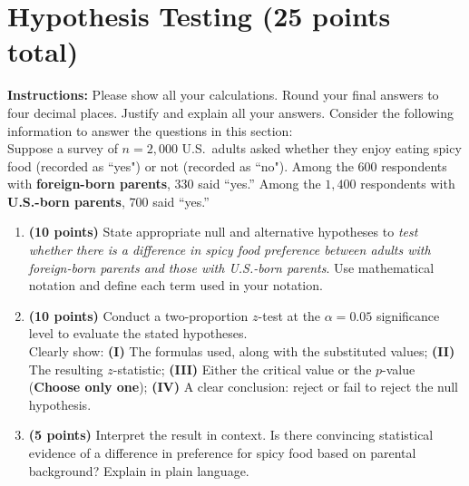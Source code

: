 \documentclass{article}
\newcommand{\blankbox}[2][3cm]{%
    \vspace{-0.5em}
    \begin{figure}[H]
        \makebox[\linewidth]{%
            \begin{tcolorbox}[
                colback=white,
                colframe=white,  %
                width=#2, %
                height=#1,
                boxrule=0.2mm
            ]
            \end{tcolorbox}
        }
    \end{figure}
    \vspace{-2em}
}
\begin{document}
\newpage

\section{Hypothesis Testing (25 points total)}
\noindent\textbf{Instructions:} Please show all your calculations. Round your final answers to four decimal places. Justify and explain all your answers. Consider the following information to answer the questions in this section: \\

Suppose a survey of $n = 2{,}000$ U.S.\ adults asked whether they enjoy eating spicy food (recorded as ``yes") or not (recorded as ``no"). Among the $600$ respondents with \textbf{foreign-born parents}, $330$ said “yes.” Among the $1{,}400$ respondents with \textbf{U.S.-born parents}, $700$ said “yes.”

\begin{enumerate}
    \item \textbf{(10 points)} State appropriate null and alternative hypotheses to \emph{test whether there is a difference in spicy food preference between adults with foreign-born parents and those with U.S.-born parents}. Use mathematical notation and define each term used in your notation. \blankbox[3cm]{1.0\linewidth}

    \item \textbf{(10 points)} Conduct a two-proportion $z$-test at the $\alpha = 0.05$ significance level to evaluate the stated hypotheses. \\
    Clearly show: \textbf{(I)} The formulas used, along with the substituted values;
    \textbf{(II)} The resulting $z$-statistic;
    \textbf{(III)} Either the critical value or the $p$-value (\textbf{Choose only one});
    \textbf{(IV)} A clear conclusion: reject or fail to reject the null hypothesis.
    \blankbox[9cm]{1.0\linewidth}

    \item  \textbf{(5 points)}  Interpret the result in context. Is there convincing statistical evidence of a difference in preference for spicy food based on parental background? Explain in plain language. \blankbox[6cm]{1.0\linewidth}
\end{enumerate}
\end{document}
